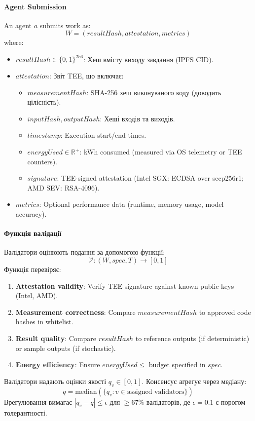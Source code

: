 \documentclass[11pt]{article}
\begin{document}
\paragraph{Agent Submission} An agent $a$ submits work as:
\begin{equation}
W = (resultHash, attestation, metrics)
\end{equation}
where:
\begin{itemize}[noitemsep]
  \item $resultHash \in \{0,1\}^{256}$: Хеш вмісту виходу завдання (IPFS CID).
  \item $attestation$: Звіт TEE, що включає:
    \begin{itemize}[noitemsep]
      \item $measurementHash$: SHA-256 хеш виконуваного коду (доводить цілісність).
      \item $inputHash, outputHash$: Хеші входів та виходів.
      \item $timestamp$: Execution start/end times.
      \item $energyUsed \in \mathbb{R}^+$: kWh consumed (measured via OS telemetry or TEE counters).
      \item $signature$: TEE-signed attestation (Intel SGX: ECDSA over secp256r1; AMD SEV: RSA-4096).
    \end{itemize}
  \item $metrics$: Optional performance data (runtime, memory usage, model accuracy).
\end{itemize}

\paragraph{Функція валідації} Валідатори оцінюють подання за допомогою функції:
\begin{equation}
\mathcal{V}: (W, spec, T) \rightarrow [0, 1]
\end{equation}
Функція перевіряє:
\begin{enumerate}[noitemsep]
  \item \textbf{Attestation validity}: Verify TEE signature against known public keys (Intel, AMD).
  \item \textbf{Measurement correctness}: Compare $measurementHash$ to approved code hashes in whitelist.
  \item \textbf{Result quality}: Compare $resultHash$ to reference outputs (if deterministic) or sample outputs (if stochastic).
  \item \textbf{Energy efficiency}: Ensure $energyUsed \leq$ budget specified in $spec$.
\end{enumerate}
Валідатори надають оцінки якості $q_v \in [0,1]$. Консенсус агрегує через медіану:
\begin{equation}
q = \text{median}(\{q_v : v \in \text{assigned validators}\})
\end{equation}
Врегулювання вимагає $|q_v - q| \leq \epsilon$ для $\geq 67\%$ валідаторів, де $\epsilon = 0.1$ є порогом толерантності.
\end{document}

